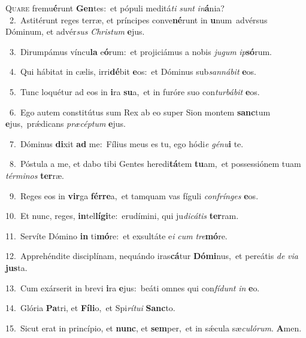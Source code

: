 \lettrine{\initial\textcolor{\initialcolor}{Q}}{uare} fremu\-\textbf{é}\-runt \textbf{Gen}\-tes:~\star et pópuli meditá\textit{ti} \textit{sunt} \textit{in}\-\textbf{á}nia?\\
{\numbfont\textcolor{\numbcolor}{~2.}}~Astitérunt reges terræ, et príncipes conve\-\textbf{né}\-runt in \textbf{u}\-num~\star advérsus Dóminum, et advér\textit{sus} \textit{Chris}\-\textit{tum} \textbf{e}\-jus.\par
{\numbfont\textcolor{\numbcolor}{~3.}}~Dirumpámus víncu\textbf{la} e\-\textbf{ó}\-rum:~\star et projiciámus a nobis \textit{ju}\-\textit{gum} \textit{ip}\-\textbf{só}rum.\par
{\numbfont\textcolor{\numbcolor}{~4.}}~Qui hábitat in cælis, irri\-\textbf{dé}\-bit \textbf{e}\-os:~\star et Dóminus sub\-\textit{san}\-\textit{ná}\textit{bit} \textbf{e}\-os.\par
{\numbfont\textcolor{\numbcolor}{~5.}}~Tunc loquétur ad eos in \textbf{i}\-ra \textbf{su}\-a,~\star et in furóre suo con\-\textit{tur}\-\textit{bá}\textit{bit} \textbf{e}\-os.\par
{\numbfont\textcolor{\numbcolor}{~6.}}~Ego autem constitútus sum Rex ab eo super Sion montem \textbf{sanc}\-tum \textbf{e}\-jus,~\star prǽdicans \textit{præ}\-\textit{cép}\textit{tum} \textbf{e}\-jus.\par
{\numbfont\textcolor{\numbcolor}{~7.}}~Dóminus \textbf{di}\-xit \textbf{ad} me:~\star Fílius meus es tu, ego hódi\textit{e} \textit{gé}\-\textit{nu}\textbf{i} te.\par
{\numbfont\textcolor{\numbcolor}{~8.}}~Póstula a me, et dabo tibi Gentes heredi\-\textbf{tá}\-tem \textbf{tu}\-am,~\star et possessiónem tuam \textit{tér}\-\textit{mi}\textit{nos} \textbf{ter}\-ræ.\par
{\numbfont\textcolor{\numbcolor}{~9.}}~Reges eos in \textbf{vir}\-ga \textbf{fér}\-\textbf{re}a,~\star et tamquam vas fíguli \textit{con}\-\textit{frín}\textit{ges} \textbf{e}\-os.\par
{\numbfont\textcolor{\numbcolor}{10.}}~Et nunc, reges, \textbf{in}\-tel\-\textbf{lí}\-\textbf{gi}te:~\star erudímini, qui ju\-\textit{di}\-\textit{cá}\textit{tis} \textbf{ter}\-ram.\par
{\numbfont\textcolor{\numbcolor}{11.}}~Servíte Dómino \textbf{in} ti\-\textbf{mó}\-re:~\star et exsultáte e\textit{i} \textit{cum} \textit{tre}\-\textbf{mó}re.\par
{\numbfont\textcolor{\numbcolor}{12.}}~Apprehéndite disciplínam, nequándo iras\-\textbf{cá}\-tur \textbf{Dó}\-\textbf{mi}nus,~\star et pereátis \textit{de} \textit{vi}\-\textit{a} \textbf{jus}\-ta.\par
{\numbfont\textcolor{\numbcolor}{13.}}~Cum exárserit in brevi \textbf{i}\-ra \textbf{e}\-jus:~\star beáti omnes qui con\-\textit{fí}\-\textit{dunt} \textit{in} \textbf{e}\-o.\par
{\numbfont\textcolor{\numbcolor}{14.}}~Glória \textbf{Pa}\-tri, et \textbf{Fí}\-\textbf{li}o,~\star et Spi\-\textit{rí}\-\textit{tu}\textit{i} \textbf{Sanc}\-to.\par
{\numbfont\textcolor{\numbcolor}{15.}}~Sicut erat in princípio, et \textbf{nunc}\-, et \textbf{sem}\-per,~\star et in sǽcula sæ\-\textit{cu}\-\textit{ló}\textit{rum}. \textbf{A}\-men.\par
